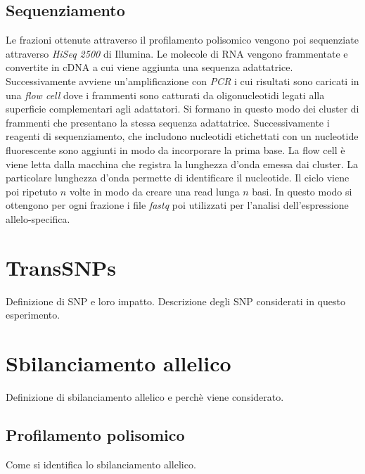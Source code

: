 \subsection{Sequenziamento}
Le frazioni ottenute attraverso il profilamento polisomico vengono poi sequenziate attraverso \emph{HiSeq 2500} di Illumina.
Le molecole di RNA vengono frammentate e convertite in cDNA a cui viene aggiunta una sequenza adattatrice.
Successivamente avviene un'amplificazione con \emph{PCR} i cui risultati sono caricati in una \emph{flow cell} dove i frammenti sono catturati da oligonucleotidi legati alla superficie complementari agli adattatori.
Si formano in questo modo dei cluster di frammenti che presentano la stessa sequenza adattatrice.
Successivamente i reagenti di sequenziamento, che includono nucleotidi etichettati con un nucleotide fluorescente sono aggiunti in modo da incorporare la prima base.
La flow cell \`e viene letta dalla macchina che registra la lunghezza d'onda emessa dai cluster.
La particolare lunghezza d'onda permette di identificare il nucleotide.
Il ciclo viene poi ripetuto $n$ volte in modo da creare una read lunga $n$ basi.
In questo modo si ottengono per ogni frazione i file \emph{fastq} poi utilizzati per l'analisi dell'espressione allelo-specifica.






\section{TransSNPs}
\label{sec:transsnps}
Definizione di SNP e loro impatto.
Descrizione degli SNP considerati in questo esperimento.

\section{Sbilanciamento allelico}
\label{sec:allelicimbalance}
Definizione di sbilanciamento allelico e perch\`e viene considerato.

	\subsection{Profilamento polisomico}
	\label{subsec:polysomalprofiling}
	Come si identifica lo sbilanciamento allelico.
